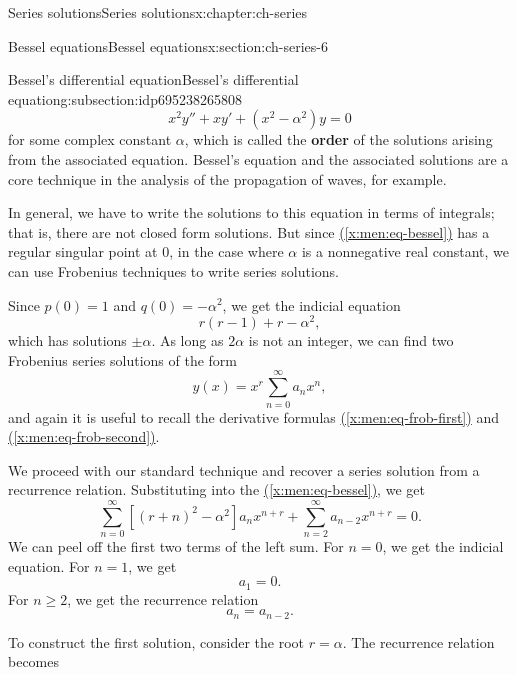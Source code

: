 \documentclass[oneside,10pt,]{book}
\newcommand{\xreffont}{\relax}
\newcommand{\terminology}[1]{\textbf{#1}}
\numberwithin{equation}{section}
\numberwithin{equation}{section}
\begin{document}
\begin{chapterptx}{Series solutions}{}{Series solutions}{}{}{x:chapter:ch-series}
\begin{sectionptx}{Bessel equations}{}{Bessel equations}{}{}{x:section:ch-series-6}
\begin{subsectionptx}{Bessel's differential equation}{}{Bessel's differential equation}{}{}{g:subsection:idp695238265808}
\begin{equation}
x^2 y''+ x y' + (x^2 - \alpha^2) y = 0\label{x:men:eq-bessel}
\end{equation}
for some complex constant \(\alpha\), which is called the \terminology{order} of the solutions arising from the associated equation. Bessel's equation and the associated solutions are a core technique in the analysis of the propagation of waves, for example.%
\par
In general, we have to write the solutions to this equation in terms of integrals; that is, there are not closed form solutions. But since \hyperref[x:men:eq-bessel]{({\xreffont\ref{x:men:eq-bessel}})} has a regular singular point at \(0\), in the case where \(\alpha\) is a nonnegative real constant, we can use Frobenius techniques to write series solutions.%
\par
Since \(p(0) = 1\) and \(q(0) = -\alpha^2\), we get the indicial equation%
\begin{equation*}
r(r-1) + r - \alpha^2,
\end{equation*}
which has solutions \(\pm \alpha\). As long as \(2\alpha\) is not an integer, we can find two Frobenius series solutions of the form%
\begin{equation*}
y(x) = x^r \sum_{n=0}^\infty a_n x^n,
\end{equation*}
and again it is useful to recall the derivative formulas \hyperref[x:men:eq-frob-first]{({\xreffont\ref{x:men:eq-frob-first}})} and \hyperref[x:men:eq-frob-second]{({\xreffont\ref{x:men:eq-frob-second}})}.%
\par
We proceed with our standard technique and recover a series solution from a recurrence relation. Substituting into the \hyperref[x:men:eq-bessel]{({\xreffont\ref{x:men:eq-bessel}})}, we get%
\begin{equation*}
\sum_{n=0}^\infty [(r + n)^2 - \alpha^2]a_n x^{n+r} + \sum_{n=2}^\infty a_{n-2} x^{n+r} = 0.
\end{equation*}
We can peel off the first two terms of the left sum. For \(n=0\), we get the indicial equation. For \(n = 1\), we get%
\begin{equation*}
[(r + 1)^2 - \alpha^2]a_1 = 0.
\end{equation*}
For \(n \geq 2\), we get the recurrence relation%
\begin{equation*}
[(n+r)^2 - \alpha^2]a_n = a_{n -2}.
\end{equation*}
%
\par
To construct the first solution, consider the root \(r = \alpha\). The recurrence relation becomes%

\end{subsectionptx}
\end{sectionptx}
\end{chapterptx}
\end{document}
